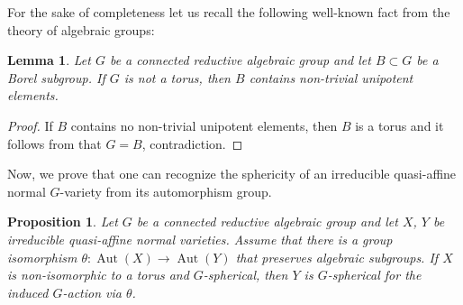 \documentclass[JEP,XML,SOM,Unicode]{cedram}
\theoremstyle{plain}
\newtheorem{lemma}[theorem]{Lemma}
\newtheorem{proposition}[theorem]{Proposition}
\theoremstyle{definition}
\DeclareMathOperator{\Aut}{Aut}
\begin{document}
For the sake of completeness let us recall the following well-known fact from the theory of
algebraic groups:

\begin{lemma}
\label{lem.B_contains_unipotent_elements}
Let $G$ be a connected reductive algebraic group and let $B \subset G$ be a Borel subgroup.
If $G$ is not a torus, then $B$ contains non-trivial unipotent elements.
\end{lemma}

\begin{proof}
If $B$ contains no non-trivial unipotent elements, then $B$ is a torus and it follows from
\cite[Prop.\,21.4B]{Hu1975Linear-algebraic-g} that $G = B$, contradiction.
\end{proof}

Now, we prove that one can recognize the sphericity of an irreducible
quasi-affine normal $G$-variety from its automorphism group.

\begin{proposition}
\label{prop.iso_and_sphericity}
Let $G$ be a connected reductive algebraic group and
let $X$, $Y$ be irreducible quasi-affine normal varieties.
Assume that there is a group isomorphism
$\theta \colon \Aut(X) \to \Aut(Y)$ that preserves algebraic subgroups.
If $X$ is non-isomorphic to a torus and $G$-spherical,
then $Y$ is $G$-spherical for the induced $G$-action via $\theta$.
\end{proposition}
\end{document}
